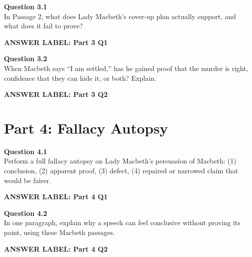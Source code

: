 \documentclass[12pt]{article}
\newcommand{\answerbox}[2]{%
\vspace{0.12em}
\noindent\textbf{#1}\par
\vspace{0.04em}
\noindent\fbox{%
\begin{minipage}[t][#2]{\dimexpr\textwidth-2\fboxsep-2\fboxrule}
\rule{\textwidth}{0pt}
\vspace{#2}
\end{minipage}}
\par\vspace{0.22em}}
\begin{document}
\textbf{Question 3.1}\\[-0.15em]
In Passage 2, what does Lady Macbeth's cover-up plan actually support, and what does it fail to prove?

\answerbox{ANSWER LABEL: Part 3 Q1}{2.45in}

\textbf{Question 3.2}\\[-0.15em]
When Macbeth says ``I am settled,'' has he gained proof that the murder is right, confidence that they can hide it, or both? Explain.

\answerbox{ANSWER LABEL: Part 3 Q2}{2.45in}

\newpage

\section*{Part 4: Fallacy Autopsy}

\textbf{Question 4.1}\\[-0.15em]
Perform a full fallacy autopsy on Lady Macbeth's persuasion of Macbeth: (1) conclusion, (2) apparent proof, (3) defect, (4) repaired or narrowed claim that would be fairer.

\answerbox{ANSWER LABEL: Part 4 Q1}{2.65in}

\textbf{Question 4.2}\\[-0.15em]
In one paragraph, explain why a speech can feel conclusive without proving its point, using these Macbeth passages.

\answerbox{ANSWER LABEL: Part 4 Q2}{2.45in}
\end{document}
